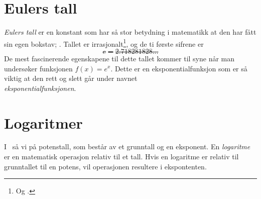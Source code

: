 \newpage
{}
\section{Eulers tall}
\textit{Eulers tall} er en konstant som har så stor betydning i matematikk at den har fått sin egen bokstav; . Tallet er irrasjonalt\footnote{Og .}, og de ti første sifrene er
\st{\[ e=2.718281828... \]}
De mest fascinerende egenskapene til dette tallet kommer til syne når man undersøker funksjonen ${f(x)= e^x} $. Dette er en eksponentialfunksjon som er så viktig at den rett og slett går under navnet \\\textit{eksponentialfunksjonen}.
\section{Logaritmer}
I \mb\, så vi på potenstall, som består av et grunntall og en eksponent. En \textit{logaritme} er en matematisk operasjon relativ til et tall. Hvis en logaritme er relativ til grunntallet til en potens, vil operasjonen resultere i ekspontenten.\vsk

